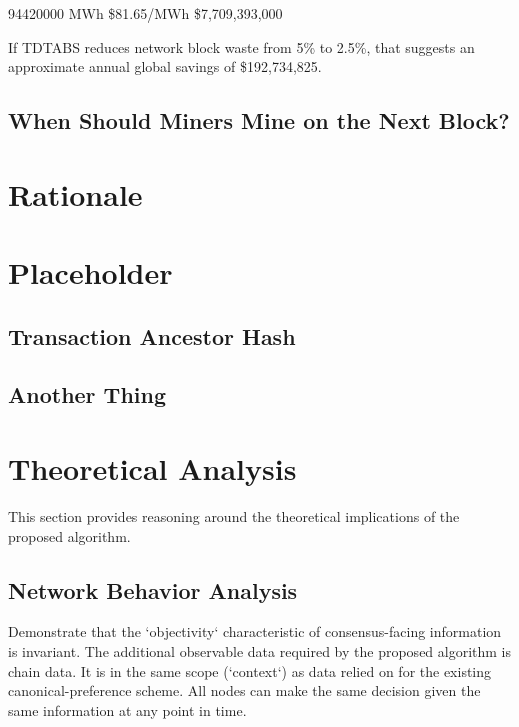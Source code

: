 \documentclass[11pt]{article}
\theoremstyle{plain}
\begin{document}
94420000 MWh \times \$81.65/MWh \equiv \$7,709,393,000

If TDTABS reduces network block waste from 5\% to 2.5\%, that suggests an
approximate annual global savings of \$192,734,825.




\subsection{\normalsize{When Should Miners Mine on the Next Block?}}

\pagebreak
\section{\normalsize{Rationale}}

\pagebreak
\section{Placeholder}
\subsection{\normalsize{Transaction Ancestor Hash}}


\subsection{\normalsize{Another Thing}}

\pagebreak
\section{\normalsize{Theoretical Analysis}}

This section provides reasoning around the theoretical implications of the
proposed algorithm.




\subsection{\normalsize{Network Behavior Analysis}}

Demonstrate that the `objectivity` characteristic of consensus-facing
information is invariant.
The additional observable data required by the proposed algorithm is chain
data. It is in the same scope (`context`) as data relied on for the existing
canonical-preference scheme.
All nodes can make the same decision given the same information at any point in
time.
\end{document}
